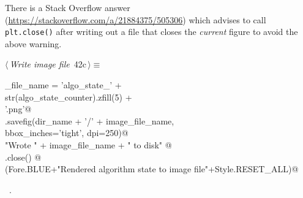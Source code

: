 \documentclass[11.5pt]{report}
\begin{document}
There is a  Stack Overflow answer (\url{https://stackoverflow.com/a/21884375/505306}) 
which advises to call \verb|plt.close()| after writing out a file that closes the 
\textit{current} figure to avoid the above warning. 
\begin{flushleft} \small\label{scrap60}\raggedright\small
{} $\langle\,${\itshape Write image file}\nobreak\ {\footnotesize {42c}}$\,\rangle\equiv$
\vspace{-1ex}
\begin{list}{}{} \item
\mbox{}\verb@image_file_name = 'algo_state_'                    +\@\\
\mbox{}\verb@                  str(algo_state_counter).zfill(5) +\@\\
\mbox{}\verb@                     '.png'@\\
\mbox{}\verb@plt.savefig(dir_name + '/' + image_file_name,  \@\\
\mbox{}\verb@            bbox_inches='tight', dpi=250)@\\
\mbox{}\verb@print "Wrote " + image_file_name + " to disk"   @\\
\mbox{}\verb@plt.close() @\\
\mbox{}\verb@debug(Fore.BLUE+"Rendered algorithm state to image file"+Style.RESET_ALL)@\\
\mbox{}\verb@@{\NWsep}
\end{list}
\vspace{-1.5ex}
\footnotesize
\begin{list}{}{\setlength{\itemsep}{-\parsep}\setlength{\itemindent}{-\leftmargin}}
\item \NWtxtMacroRefIn\ .

\item{}
\end{list}
\vspace{4ex}
\end{flushleft}
\end{document}
